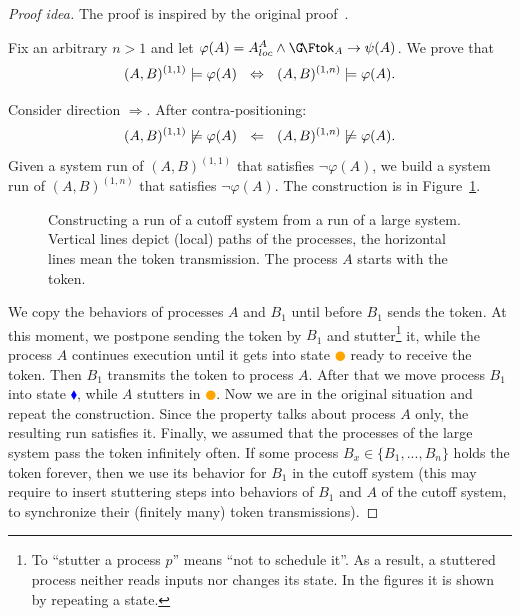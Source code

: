   \begin{proof}[Proof idea]
    The proof is inspired by the original proof~\cite{Emerso03}.

    Fix an arbitrary $n>1$ and let $\varphi(A) = A^A_{loc}\land \GF \token_A \impl \psi(A)$.
    We prove that
    $$
    (A,B)^{(1,1)} \models \varphi(A) ~~\Leftrightarrow~~ (A,B)^{(1,n)} \models \varphi(A).
    $$

    Consider direction $\Rightarrow$. After contra-positioning:
    $$
    (A,B)^{(1,1)} \not\models \varphi(A) ~~\Leftarrow~~ (A,B)^{(1,n)} \not\models \varphi(A).
    $$
    Given a system run of $(A,B)^{(1,1)}$ that satisfies $\neg\varphi(A)$,
    we build a system run of $(A,B)^{(1,n)}$ that satisfies $\neg\varphi(A)$.
    The construction is in Figure~\ref{amba:fig:simulation_proof_1}.
    \begin{figure}[t]
      \caption{Constructing a run of a cutoff system from a run of a large system.
        Vertical lines depict (local) paths of the processes,
        the horizontal lines mean the token transmission.
        The process $A$ starts with the token.%
      }
      \label{amba:fig:simulation_proof_1}
    \end{figure}
    We copy the behaviors of processes $A$ and $B_1$ until before $B_1$ sends the token.
    At this moment, we postpone sending the token by $B_1$ and stutter\footnote{
      To ``stutter a process $p$'' means ``not to schedule it''.
      As a result, a stuttered process neither reads inputs nor changes its state.
      In the figures it is shown by repeating a state.%
    }
    it,
    while the process $A$ continues execution until it gets into state \textcolor{orange}{$\CIRCLE$}
    ready to receive the token.
    Then $B_1$ transmits the token to process $A$.
    After that we move process $B_1$ into state \textcolor{blue}{$\blacklozenge$},
    while $A$ stutters in \textcolor{orange}{$\CIRCLE$}.
    Now we are in the original situation and repeat the construction.
    Since the property talks about process $A$ only, the resulting run satisfies it.
    Finally, we assumed that the processes of the large system pass the token infinitely often.
    If some process $B_x \in \{B_1,...,B_n\}$ holds the token forever,
    then we use its behavior for $B_1$ in the cutoff system
    (this may require to insert stuttering steps into behaviors of $B_1$ and $A$ of the cutoff system,
     to synchronize their (finitely many) token transmissions).


\end{proof}
